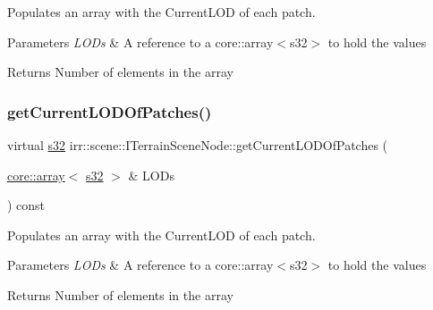 Populates an array with the Current\+L\+OD of each patch. 


\begin{DoxyParams}{Parameters}
{\em L\+O\+Ds} & A reference to a core\+::array$<$s32$>$ to hold the values \\
\hline
\end{DoxyParams}
\begin{DoxyReturn}{Returns}
Number of elements in the array 
\end{DoxyReturn}
\mbox{\label{classirr_1_1scene_1_1ITerrainSceneNode_a0d310851f0ebf1fce18d3a2c0f3dceab}} 
\subsubsection{\texorpdfstring{get\+Current\+L\+O\+D\+Of\+Patches()}{getCurrentLODOfPatches()}\hspace{0.1cm}{\footnotesize\ttfamily [2/2]}}
{\footnotesize\ttfamily virtual \hyperlink{namespaceirr_ac66849b7a6ed16e30ebede579f9b47c6}{s32} irr\+::scene\+::\+I\+Terrain\+Scene\+Node\+::get\+Current\+L\+O\+D\+Of\+Patches (\begin{DoxyParamCaption}\item[{\hyperlink{classirr_1_1core_1_1array}{core\+::array}$<$ \hyperlink{namespaceirr_ac66849b7a6ed16e30ebede579f9b47c6}{s32} $>$ \&}]{L\+O\+Ds }\end{DoxyParamCaption}) const\hspace{0.3cm}{\ttfamily [pure virtual]}}



Populates an array with the Current\+L\+OD of each patch. 


\begin{DoxyParams}{Parameters}
{\em L\+O\+Ds} & A reference to a core\+::array$<$s32$>$ to hold the values \\
\hline
\end{DoxyParams}
\begin{DoxyReturn}{Returns}
Number of elements in the array 
\end{DoxyReturn}
\mbox{\label{classirr_1_1scene_1_1ITerrainSceneNode_a0f09a8260f325570ce58f0fc6993aff9}} 
